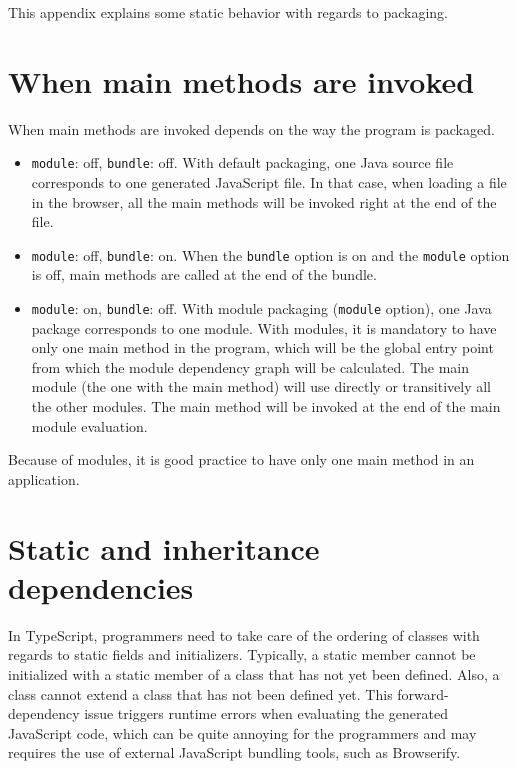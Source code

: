\documentclass[a4paper]{report}
\begin{document}
This appendix explains some static behavior with regards to packaging.

\section*{When main methods are invoked}

When main methods are invoked depends on the way the program is packaged. 

\begin{itemize}
\item \texttt{module}: off, \texttt{bundle}: off. With default packaging, one Java source file corresponds to one generated JavaScript file. In that case, when loading a file in the browser, all the main methods will be invoked right at the end of the file. 
\item \texttt{module}: off, \texttt{bundle}: on. When the \texttt{bundle} option is on and the \texttt{module} option is off, main methods are called at the end of the bundle.
\item \texttt{module}: on, \texttt{bundle}: off. With module packaging (\texttt{module} option), one Java package corresponds to one module. With modules, it is mandatory to have only one main method in the program, which will be the global entry point from which the module dependency graph will be calculated. The main module (the one with the main method) will use directly or transitively all the other modules. The main method will be invoked at the end of the main module evaluation.
\end{itemize}

Because of modules, it is good practice to have only one main method in an application.

\section*{Static and inheritance dependencies}

In TypeScript, programmers need to take care of the ordering of classes with regards to static fields and initializers. Typically, a static member cannot be initialized with a static member of a class that has not yet been defined. Also, a class cannot extend a class that has not been defined yet. This forward-dependency issue triggers runtime errors when evaluating the generated JavaScript code, which can be quite annoying for the programmers and may requires the use of external JavaScript bundling tools, such as Browserify.
\end{document}
